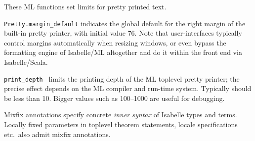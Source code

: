\begin{isabellebody}
\begin{isamarkuptext}
  These ML functions set limits for pretty printed text.

  \begin{description}

  \item \verb|Pretty.margin_default| indicates the global default for
  the right margin of the built-in pretty printer, with initial value
  76.  Note that user-interfaces typically control margins
  automatically when resizing windows, or even bypass the formatting
  engine of Isabelle/ML altogether and do it within the front end via
  Isabelle/Scala.

  \item \verb|print_depth|~ limits the printing depth of the
  ML toplevel pretty printer; the precise effect depends on the ML
  compiler and run-time system.  Typically  should be less
  than 10.  Bigger values such as 100--1000 are useful for debugging.

  \end{description}%
\end{isamarkuptext}%
\isamarkuptrue%
%
\isamarkuptrue%
%
\begin{isamarkuptext}%
Mixfix annotations specify concrete \emph{inner syntax} of
  Isabelle types and terms.  Locally fixed parameters in toplevel
  theorem statements, locale specifications etc.\ also admit mixfix
  annotations.


\end{isamarkuptext}
\end{isabellebody}

